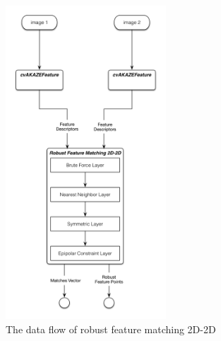  \begin{figure}[H]
  \centering
  \includegraphics[width=60mm]{figures/robust_feature_matching_2D_2D}
  \caption{The data flow of robust feature matching 2D-2D}\label{fig:robust_feature_matching_2D_2D}
\end{figure}

